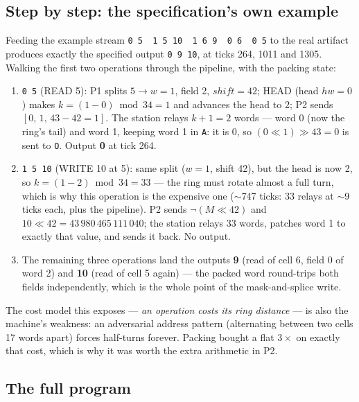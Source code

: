 \documentclass[11pt,a4paper]{article}
\newcommand{\op}[1]{\texttt{#1}}
\begin{document}
\subsection{Step by step: the specification's own example}

Feeding the example stream \texttt{0 5\ \ 1 5 10\ \ 1 6 9\ \ 0 6\ \ 0 5}
to the real artifact produces exactly the specified output \texttt{0 9 10},
at ticks 264, 1011 and 1305. Walking the first two operations through the
pipeline, with the packing state:

\begin{enumerate}
  \item \texttt{0 5} (READ 5): P1 splits $5 \to w{=}1$,
        field 2, $\mathit{shift}{=}42$; HEAD (head $\mathit{hw}{=}0$) makes
        $k=(1-0)\bmod34=1$ and advances the head to 2; P2 sends
        $[0,\,1,\,43{-}42{=}1]$. The station relays $k{+}1=2$ words ---
        word 0 (now the ring's tail) and word 1, keeping word 1 in \op{A}:
        it is 0, so $(0\ll1)\gg43=0$ is sent to \texttt{O}. Output
        \textbf{0} at tick 264.
  \item \texttt{1 5 10} (WRITE 10 at 5): same split ($w{=}1$, shift 42),
        but the head is now 2, so $k=(1-2)\bmod 34=33$ --- the ring must
        rotate almost a full turn, which is why this operation is the
        expensive one ($\sim$747 ticks: 33 relays at $\sim$9 ticks each,
        plus the pipeline). P2 sends
        $\lnot(M\ll42)$ and $10\ll42=43\,980\,465\,111\,040$; the station
        relays 33 words, patches word 1 to exactly that value, and sends it
        back. No output.
  \item The remaining three operations land the outputs \textbf{9}
        (read of cell 6, field 0 of word 2) and \textbf{10} (read of cell
        5 again) --- the packed word round-trips both fields
        independently, which is the whole point of the mask-and-splice
        write.
\end{enumerate}

The cost model this exposes --- \emph{an operation costs its ring distance}
--- is also the machine's weakness: an adversarial address pattern
(alternating between two cells 17 words apart) forces half-turns forever.
Packing bought a flat $3\times$ on exactly that cost, which is why it was
worth the extra arithmetic in P2.

\subsection{The full program}
\end{document}
